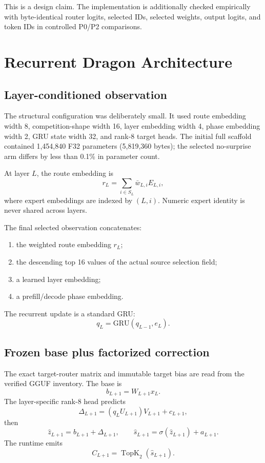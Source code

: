 \documentclass[11pt]{article}
\newcommand{\TopK}{\operatorname{TopK}}
\begin{document}
This is a design claim. The implementation is additionally checked empirically with byte-identical router logits, selected IDs, selected weights, output logits, and token IDs in controlled P0/P2 comparisons.

\section{Recurrent Dragon Architecture}

\subsection{Layer-conditioned observation}

The structural configuration was deliberately small. It used route embedding width 8, competition-shape width 16, layer embedding width 4, phase embedding width 2, GRU state width 32, and rank-8 target heads. The initial full scaffold contained 1,454,840 F32 parameters (5,819,360 bytes); the selected no-surprise arm differs by less than 0.1\% in parameter count.

At layer $L$, the route embedding is
\begin{equation}
r_L=\sum_{i\in S_L}\bar w_{L,i}E_{L,i},
\end{equation}
where expert embeddings are indexed by $(L,i)$. Numeric expert identity is never shared across layers.

The final selected observation concatenates:
\begin{enumerate}
  \item the weighted route embedding $r_L$;
  \item the descending top 16 values of the actual source selection field;
  \item a learned layer embedding;
  \item a prefill/decode phase embedding.
\end{enumerate}

The recurrent update is a standard GRU:
\begin{equation}
q_L=\mathrm{GRU}(q_{L-1},e_L).
\end{equation}

\subsection{Frozen base plus factorized correction}

The exact target-router matrix and immutable target bias are read from the verified GGUF inventory. The base is
\begin{equation}
b_{L+1}=W_{L+1}x_L.
\end{equation}
The layer-specific rank-8 head predicts
\begin{equation}
\Delta_{L+1}=(q_LU_{L+1})V_{L+1}+c_{L+1},
\end{equation}
then
\begin{equation}
\hat z_{L+1}=b_{L+1}+\Delta_{L+1},\qquad
\hat s_{L+1}=\sigma(\hat z_{L+1})+a_{L+1}.
\end{equation}
The runtime emits
\begin{equation}
C_{L+1}=\TopK_2(\hat s_{L+1}).
\end{equation}
\end{document}
